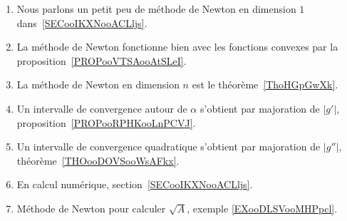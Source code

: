 
	\label{THEMEooMethodeNewton}
\begin{enumerate}
	\item
	      Nous parlons un petit peu de méthode de Newton en dimension \( 1\) dans~\ref{SECooIKXNooACLljs}.
	\item
	      La méthode de Newton fonctionne bien avec les fonctions convexes par la proposition~\ref{PROPooVTSAooAtSLeI}.
	\item
	      La méthode de Newton en dimension \( n\) est le théorème~\ref{ThoHGpGwXk}.
	\item
	      Un intervalle de convergence autour de \( \alpha\) s'obtient par majoration de \( | g' |\), proposition~\ref{PROPooRPHKooLnPCVJ}.
	\item
	      Un intervalle de convergence quadratique s'obtient par majoration de \( | g'' |\), théorème~\ref{THOooDOVSooWsAFkx}.
	\item
	      En calcul numérique, section~\ref{SECooIKXNooACLljs}.
	\item
	      Méthode de Newton pour calculer \( \sqrt{ A }\), exemple \ref{EXooDLSVooMHPpcl}.
\end{enumerate}

